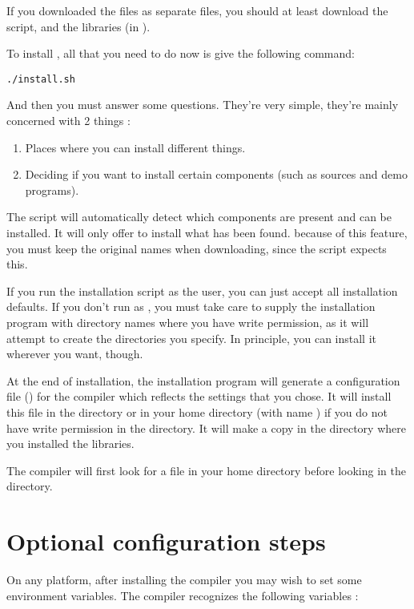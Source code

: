 If you downloaded the files as separate files, you should at least download
the  script, and the libraries (in ).

To install \fpc, all that you need to do now is give the following command:
\begin{verbatim}
./install.sh
\end{verbatim}
And then you must answer some questions. They're very simple, they're
mainly concerned with 2 things :
\begin{enumerate}
\item Places where you can install different things.
\item Deciding if you want to install certain components (such as sources
and demo programs).
\end{enumerate}
The script will automatically detect which components are present and can be
installed. It will only offer to install what has been found.
because of this feature, you must keep the original names when downloading,
since the script expects this.

If you run the installation script as the  user, you can just accept all installation
defaults. If you don't run as , you must take care to supply the
installation program with directory names where you have write permission,
as it will attempt to create the directories you specify.
In principle, you can install it wherever you want, though.

At the end of installation, the installation program will generate a
configuration file () for the \fpc compiler which 
reflects the settings that you chose. It will install this file in 
the  directory or in your home directory (with name
) if you do not have write permission in the 
directory. It will make a copy in the directory where you installed the 
libraries.

The compiler will first look for a file  in your home 
directory before looking in the  directory.

\section{Optional configuration steps}
On any platform, after installing the compiler you may wish to set
some environment variables. The \fpc compiler recognizes the 
following variables :

